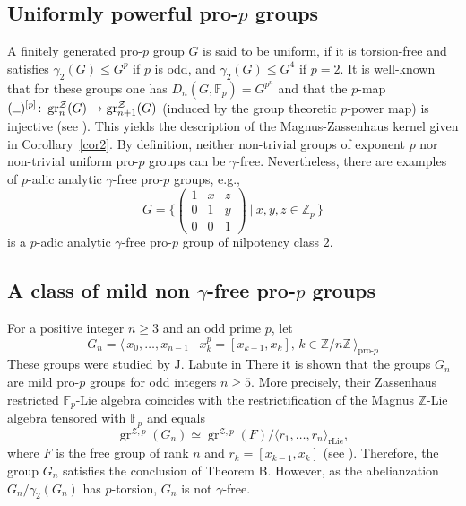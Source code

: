 \documentclass{amsart}
\theoremstyle{plain}
\theoremstyle{definition}
\numberwithin{theorem}{section}
\numberwithin{equation}{section}
\newcommand{\rLie}{\mathrm{rLie}}
\newcommand{\gr}{\operatorname{gr}}
\newcommand{\grZ}{\operatorname{gr}^{{\mathcal Z}, p}}
\newcommand{\FF}{\mathbb{F}}
\newcommand{\Z}{\mathbb Z}
\newcommand{\argu}{\hbox to 1.5ex{\hrulefill}}  %
\begin{document}
\subsection{Uniformly powerful pro-$p$ groups}
\label{sss:unif}
A finitely generated pro-$p$ group $G$ is said to be uniform,
if it is torsion-free and satisfies $\gamma_2(G)\leq G^p$ if $p$ is odd, and $\gamma_2(G)\leq G^4$ if $p=2$.
It is well-known that for these groups one has
$D_n(G,\FF_p)=G^{p^n}$ and that the $p$-map $(\argu)^{[p]}\colon\gr^{\mathcal Z}_n(G) \to\gr^{\mathcal Z}_{n+1}(G)$ (induced by the group theoretic $p$-power map) is injective (see \cite{DDSMS}). This yields the description of the Magnus-Zassenhaus kernel given in Corollary~\ref{cor2}.
By definition, neither non-trivial groups of exponent $p$ nor non-trivial uniform pro-$p$ groups can be $\gamma$-free.
Nevertheless, there are examples of $p$-adic analytic $\gamma$-free pro-$p$ groups, e.g.,
\begin{equation}
\label{eq:utrZp}
G = \Bigg\{\left(\begin{matrix} 1&x & z \\ 0 & 1&y\\
0&0&1\end{matrix}\right)\ \Bigg\vert\ x,y,z\in\Z_p\,\Bigg\}
\end{equation} 
is a $p$-adic analytic $\gamma$-free
pro-$p$ group of nilpotency class $2$.



\subsection{A class of mild non $\gamma$-free pro-$p$ groups}
\label{sss:mild}
For a positive integer $n\geq 3$ and an odd prime $p$, let
\begin{equation}
    \label{eq:labu1}
    G_n = \langle\, x_0, \dots, x_{n-1} \mid x_k^p = [x_{k-1}, x_k],\, k \in \Z/n\Z \,\rangle_{\text{pro-}p}
\end{equation}
These groups were studied by J. Labute  in \cite{Lab06}
There it is shown that the groups $G_n$ are mild pro-$p$ groups for odd integers $n
\geq 5$. More precisely, their Zassenhaus restricted $\FF_p$-Lie algebra
coincides with the restrictification of the Magnus $\Z$-Lie algebra tensored with $\FF_p$ and equals
\begin{equation}
\label{eq:labu2}
    \grZ(G_n)\simeq\grZ(F)/\langle r_1, \dots, r_n \rangle_{\rLie},
\end{equation}
where $F$ is the free group of rank $n$ and $r_k=[x_{k-1},x_k]$ (see \cite{Lab06}).
Therefore, the group $G_n$ satisfies the conclusion of
Theorem B. However, as the abelianzation $G_n/\gamma_2(G_n)$ has $p$-torsion, $G_n$ is not $\gamma$-free. 



\end{document}
